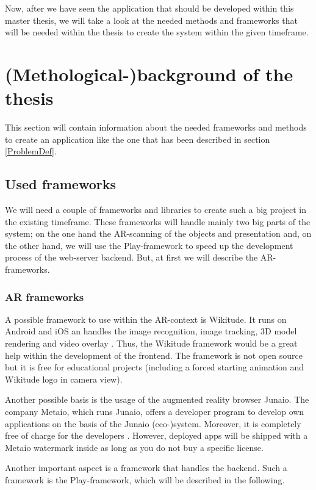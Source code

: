 \documentclass[a4page]{article}
\begin{document}
Now, after we have seen the application that should be developed within this master thesis, we will take a look at the needed methods and frameworks that will be needed within the thesis to create the system within the given timeframe. 

\section{(Methological-)background of the thesis}
This section will contain information about the needed frameworks and methods to create an application like the one that has been described in section \ref{ProblemDef}.
\subsection{Used frameworks}
We will need a couple of frameworks and libraries to create such a big project in the existing timeframe. These frameworks will handle mainly two big parts of the system; on the one hand the \ac{AR}-scanning of the objects and presentation and, on the other hand, we will use the Play-framework to speed up the development process of the web-server backend. But, at first we will describe the \ac{AR}-frameworks.

\subsubsection{AR frameworks}
A possible framework to use within the \ac{AR}-context is Wikitude. It runs on Android and iOS an handles the image recognition, image tracking, 3D model rendering and video overlay \cite{wikitude}. Thus, the Wikitude framework would be a great help within the development of the frontend. The framework is not open source but it is free for educational projects (including a forced starting animation and Wikitude logo in camera view).  

Another possible basis is the usage of the augmented reality browser Junaio. The company Metaio, which runs Junaio, offers a developer program to develop own applications on the basis of the Junaio (eco-)system. Moreover, it is completely free of charge for the developers \cite{junaio1}. However, deployed apps will be shipped with a Metaio watermark inside as long as you do not buy a specific license. 

Another important aspect is a framework that handles the backend. Such a framework is the Play-framework, which will be described in the following.
\end{document}

